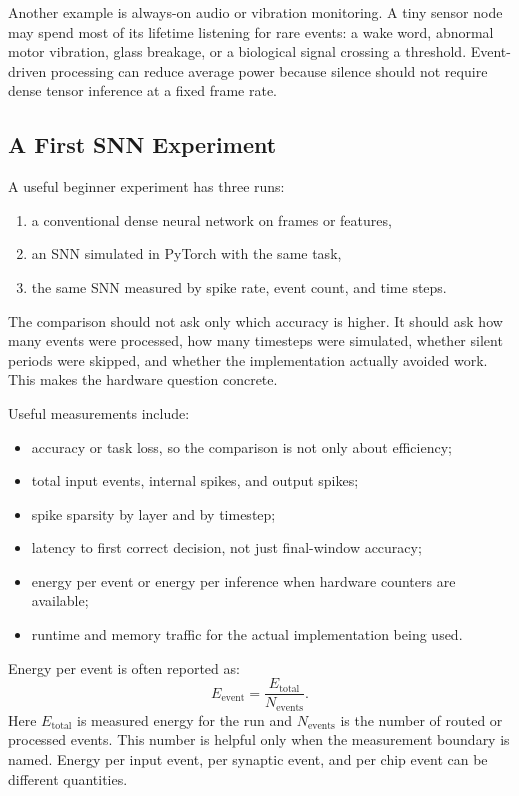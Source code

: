 Another example is always-on audio or vibration monitoring. A tiny sensor node may spend most of its lifetime listening for rare events: a wake word, abnormal motor vibration, glass breakage, or a biological signal crossing a threshold. Event-driven processing can reduce average power because silence should not require dense tensor inference at a fixed frame rate.

\subsection{A First SNN Experiment}

A useful beginner experiment has three runs:
\begin{enumerate}
  \item a conventional dense neural network on frames or features,
  \item an SNN simulated in PyTorch with the same task,
  \item the same SNN measured by spike rate, event count, and time steps.
\end{enumerate}

The comparison should not ask only which accuracy is higher. It should ask how many events were processed, how many timesteps were simulated, whether silent periods were skipped, and whether the implementation actually avoided work. This makes the hardware question concrete.

Useful measurements include:

\begin{itemize}[leftmargin=*]
  \item accuracy or task loss, so the comparison is not only about efficiency;
  \item total input events, internal spikes, and output spikes;
  \item spike sparsity by layer and by timestep;
  \item latency to first correct decision, not just final-window accuracy;
  \item energy per event or energy per inference when hardware counters are available;
  \item runtime and memory traffic for the actual implementation being used.
\end{itemize}

Energy per event is often reported as:
\[
  E_{\text{event}} =
  \frac{E_{\text{total}}}{N_{\text{events}}}.
\]
Here \(E_{\text{total}}\) is measured energy for the run and \(N_{\text{events}}\) is the number of routed or processed events. This number is helpful only when the measurement boundary is named. Energy per input event, per synaptic event, and per chip event can be different quantities.

